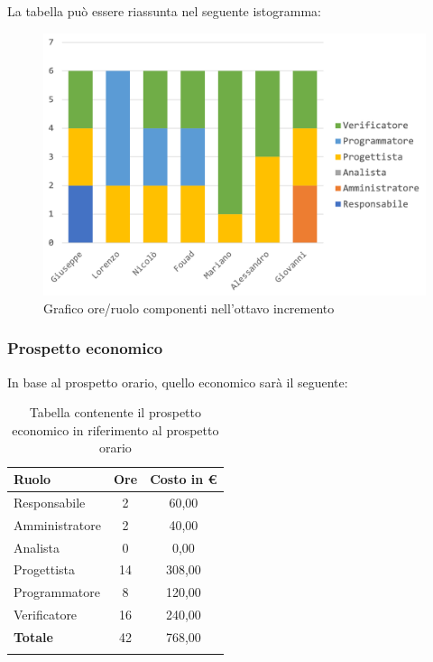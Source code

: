 		La tabella può essere riassunta nel seguente istogramma:
		\begin{figure}[H]
			\centering
			\includegraphics[width=0.8\linewidth]{./images/preventivo/incremento8-1.png}
			\caption{Grafico ore/ruolo componenti nell'ottavo incremento}
			\label{fig:grafico suddivione ruoli incremento VIII}
		\end{figure}
		
		\subsubsection{Prospetto economico}
		In base al prospetto orario, quello economico sarà il seguente: 
		
		\begin{longtable}{|l|c|c|}
			\hline
			\rowcolor{lighter-grayer}
			\textbf{Ruolo} & \textbf{Ore} & \textbf{Costo in € } \\
			\hline
			\endfirsthead
			
			\hline
			Responsabile 	    & 2 & 60,00\\
			\hline 
			\hline
			Amministratore	   & 2 & 40,00\\
			\hline
			\hline
			Analista 				& 0 & 0,00\\
			\hline
			\hline
			Progettista 		   & 14 & 308,00\\
			\hline
			\hline
			Programmatore 	  & 8 & 120,00\\
			\hline
			\hline
			Verificatore 		   & 16 & 240,00\\
			\hline
			\textbf{Totale} 	 & 42 & 768,00\\
			\hline
			\caption{Tabella contenente il prospetto economico in riferimento al prospetto orario}
		\end{longtable}
		\pagebreak
		
